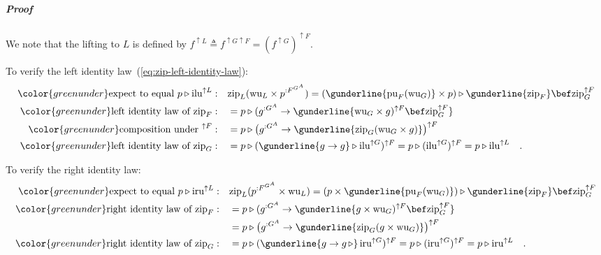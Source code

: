\subparagraph{Proof}

We note that the lifting to $L$ is defined by $f^{\uparrow L}\triangleq f^{\uparrow G\uparrow F}=(f^{\uparrow G})^{\uparrow F}$.

To verify the left identity law~(\ref{eq:zip-left-identity-law}):
\begin{align*}
{\color{greenunder}\text{expect to equal }p\triangleright\text{ilu}^{\uparrow L}:}\quad & \text{zip}_{L}(\text{wu}_{L}\times p^{:F^{G^{A}}})=(\gunderline{\text{pu}_{F}(\text{wu}_{G})}\times p)\triangleright\gunderline{\text{zip}_{F}}\bef\text{zip}_{G}^{\uparrow F}\\
{\color{greenunder}\text{left identity law of }\text{zip}_{F}:}\quad & =p\triangleright(g^{:G^{A}}\rightarrow\gunderline{\text{wu}_{G}\times g)^{\uparrow F}\bef\text{zip}_{G}^{\uparrow F}}\\
{\color{greenunder}\text{composition under }^{\uparrow F}:}\quad & =p\triangleright\big(g^{:G^{A}}\rightarrow\gunderline{\text{zip}_{G}(\text{wu}_{G}\times g)}\big)^{\uparrow F}\\
{\color{greenunder}\text{left identity law of }\text{zip}_{G}:}\quad & =p\triangleright(\gunderline{g\rightarrow g}\triangleright\text{ilu}^{\uparrow G})^{\uparrow F}=p\triangleright(\text{ilu}^{\uparrow G})^{\uparrow F}=p\triangleright\text{ilu}^{\uparrow L}\quad.
\end{align*}

To verify the right identity law:
\begin{align*}
{\color{greenunder}\text{expect to equal }p\triangleright\text{iru}^{\uparrow L}:}\quad & \text{zip}_{L}(p^{:F^{G^{A}}}\times\text{wu}_{L})=(p\times\gunderline{\text{pu}_{F}(\text{wu}_{G})})\triangleright\gunderline{\text{zip}_{F}}\bef\text{zip}_{G}^{\uparrow F}\\
{\color{greenunder}\text{right identity law of }\text{zip}_{F}:}\quad & =p\triangleright(g^{:G^{A}}\rightarrow\gunderline{g\times\text{wu}_{G})^{\uparrow F}\bef\text{zip}_{G}^{\uparrow F}}\\
 & =p\triangleright\big(g^{:G^{A}}\rightarrow\gunderline{\text{zip}_{G}(g\times\text{wu}_{G})}\big)^{\uparrow F}\\
{\color{greenunder}\text{right identity law of }\text{zip}_{G}:}\quad & =p\triangleright(\gunderline{g\rightarrow g\,\triangleright}\,\text{iru}^{\uparrow G})^{\uparrow F}=p\triangleright(\text{iru}^{\uparrow G})^{\uparrow F}=p\triangleright\text{iru}^{\uparrow L}\quad.
\end{align*}

